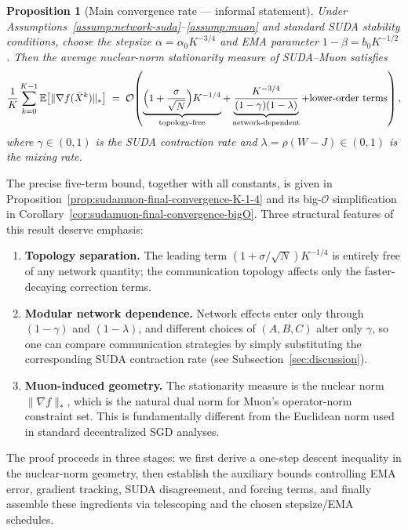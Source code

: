 \documentclass{article}
\newtheorem{proposition}{Proposition}
\newcommand{\sudamuon}{SUDA--Muon}
\begin{document}
\begin{proposition}[Main convergence rate --- informal statement]
\label{prop:main-informal}
Under Assumptions~\ref{assump:network-suda}--\ref{assump:muon} and standard SUDA stability conditions, choose the stepsize $\alpha=\alpha_0 K^{-3/4}$ and EMA parameter $1-\beta=b_0 K^{-1/2}$.
Then the average nuclear-norm stationarity measure of \sudamuon{} satisfies
\begin{equation}
\label{eq:main-rate-preview}
\frac{1}{K}\sum_{k=0}^{K-1}\mathbb{E}\big[\|\nabla f(\bar X^k)\|_*\big]
\;=\;\mathcal{O}\!\left(
\underbrace{\Bigl(1+\frac{\sigma}{\sqrt{N}}\Bigr)K^{-1/4}}_{\text{topology-free}}
+\underbrace{\frac{K^{-3/4}}{(1-\gamma)(1-\lambda)}}_{\text{network-dependent}}
+\text{lower-order terms}
\right),
\end{equation}
where $\gamma\in(0,1)$ is the SUDA contraction rate and $\lambda=\rho(W-J)\in(0,1)$ is the mixing rate.
\end{proposition}

The precise five-term bound, together with all constants, is given in Proposition~\ref{prop:sudamuon-final-convergence-K-1-4} and its big-$\mathcal{O}$ simplification in Corollary~\ref{cor:sudamuon-final-convergence-bigO}.
Three structural features of this result deserve emphasis:
\begin{enumerate}
\item \textbf{Topology separation.}
The leading term $(1+\sigma/\sqrt{N})K^{-1/4}$ is entirely free of any network quantity; the communication topology affects only the faster-decaying correction terms.
\item \textbf{Modular network dependence.}
Network effects enter only through $(1-\gamma)$ and $(1-\lambda)$, and different choices of $(A,B,C)$ alter only $\gamma$, so one can compare communication strategies by simply substituting the corresponding SUDA contraction rate (see Subsection~\ref{sec:discussion}).
\item \textbf{Muon-induced geometry.}
The stationarity measure is the nuclear norm $\|\nabla f\|_*$, which is the natural dual norm for Muon's operator-norm constraint set. This is fundamentally different from the Euclidean norm used in standard decentralized SGD analyses.
\end{enumerate}

The proof proceeds in three stages: we first derive a one-step descent inequality in the nuclear-norm geometry, then establish the auxiliary bounds controlling EMA error, gradient tracking, SUDA disagreement, and forcing terms, and finally assemble these ingredients via telescoping and the chosen stepsize/EMA schedules.
\end{document}
